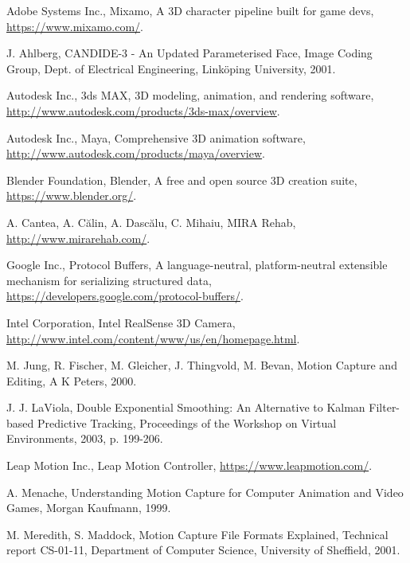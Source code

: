 \documentclass[a4paper, 12pt]{amsart}
\begin{document}
\clearpage

\begin{thebibliography}{10} %

Adobe Systems Inc., Mixamo, A 3D character pipeline built for game devs, \url{https://www.mixamo.com/}.

J. Ahlberg, CANDIDE-3 - An Updated Parameterised Face, Image Coding Group, Dept. of Electrical Engineering, Link\"{o}ping University, 2001.

Autodesk Inc., 3ds MAX, 3D modeling, animation, and rendering software, \url{http://www.autodesk.com/products/3ds-max/overview}.

Autodesk Inc., Maya, Comprehensive 3D animation software, \url{http://www.autodesk.com/products/maya/overview}.

Blender Foundation, Blender, A free and open source 3D creation suite, \url{https://www.blender.org/}.

A. Cantea, A. C\u{a}lin, A. Dasc\u{a}lu, C. Mihaiu, MIRA Rehab, \url{http://www.mirarehab.com/}.

Google Inc., Protocol Buffers, A language-neutral, platform-neutral extensible mechanism for serializing structured data, \url{https://developers.google.com/protocol-buffers/}.

Intel Corporation, Intel RealSense 3D Camera, \url{http://www.intel.com/content/www/us/en/homepage.html}.

M. Jung, R. Fischer, M. Gleicher, J. Thingvold, M. Bevan, Motion Capture and Editing, A K Peters, 2000.

J. J. LaViola, Double Exponential Smoothing: An Alternative to Kalman Filter-based Predictive Tracking, Proceedings of the Workshop on Virtual Environments, 2003, p. 199-206.

Leap Motion Inc., Leap Motion Controller, \url{https://www.leapmotion.com/}.

A. Menache, Understanding Motion Capture for Computer Animation and Video Games, Morgan Kaufmann, 1999.

M. Meredith, S. Maddock, Motion Capture File Formats Explained, Technical report CS-01-11, Department of Computer Science, University of Sheffield, 2001.


\end{thebibliography}
\end{document}
